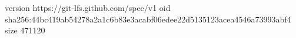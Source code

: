 version https://git-lfs.github.com/spec/v1
oid sha256:44bc419ab54278a2a1c6b83e3acabf06edee22d5135123acea4546a73993abf4
size 471120
